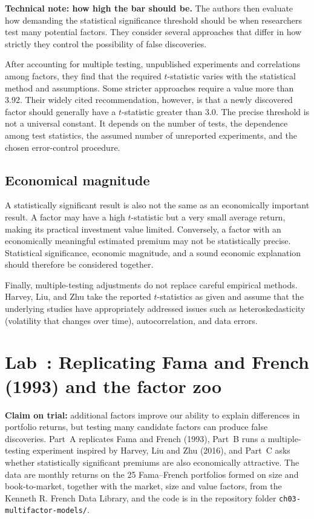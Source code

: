 \begin{technote}
\textbf{Technical note: how high the bar should be.} The authors then evaluate how demanding the statistical
significance threshold should be when researchers test many
potential factors. They consider several approaches that
differ in how strictly they control the possibility of false
discoveries. 


After accounting for multiple testing, unpublished
experiments and correlations among factors, they find
that the required $t$-statistic varies with the statistical
method and assumptions. Some stricter approaches require
a value more than 3.92. Their widely cited recommendation,
however, is that a newly discovered factor should generally
have a $t$-statistic greater than 3.0.
The precise threshold is not a universal constant. It depends
on the number of tests, the dependence among test statistics,
the assumed number of unreported experiments, and the chosen
error-control procedure.
\end{technote}

\subsection{Economical magnitude}
A statistically significant result is also not the same
as an economically important result. A factor may have a
high $t$-statistic but a very small average return, making
its practical investment value limited. Conversely, a
factor with an economically meaningful estimated premium
may not be statistically precise. Statistical significance,
economic magnitude, and a sound economic explanation
should therefore be considered together.

Finally, multiple-testing adjustments do not replace
careful empirical methods. Harvey, Liu, and Zhu take the
reported $t$-statistics as given and assume that the
underlying studies have appropriately addressed issues
such as heteroskedasticity (volatility that changes over time), autocorrelation, and data
errors.


\section{Lab~\thechapter: Replicating Fama and French (1993) and the factor zoo}
\label{sec:04-lab}

\textbf{Claim on trial:} additional factors improve our ability to explain differences in portfolio returns, but testing many candidate factors can produce false discoveries. Part~A replicates Fama and French (1993), Part~B runs a multiple-testing experiment inspired by Harvey, Liu and Zhu (2016), and Part~C asks whether statistically significant premiums are also economically attractive. The data are monthly returns on the 25 Fama--French portfolios formed on size and book-to-market, together with the market, size and value factors, from the Kenneth R. French Data Library, and the code is in the repository folder \texttt{ch03-multifactor-models/}.

